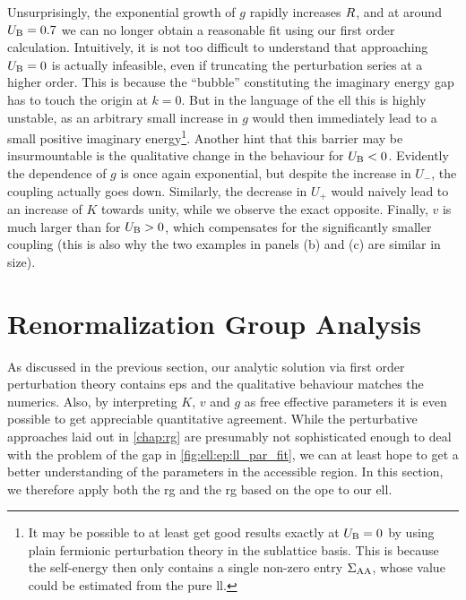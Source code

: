 Unsurprisingly, the exponential growth of $g$ rapidly increases $R$, and at around $U_{\text{B}}=0.7$ we can no longer obtain a reasonable fit using our first order calculation.
Intuitively, it is not too difficult to understand that approaching $U_{\text{B}}=0$ is actually infeasible, even if truncating the perturbation series at a higher order.
This is because the ``bubble'' constituting the imaginary energy gap has to touch the origin at $k=0$.
But in the language of the \gls{ell} this is highly unstable, as an arbitrary small increase in $g$ would then immediately lead to a small positive imaginary energy\footnote{It may be possible to at least get good results exactly at $U_{\text{B}}=0$ by using plain fermionic perturbation theory in the sublattice basis. This is because the self-energy then only contains a single non-zero entry $\Sigma_{\text{A}\text{A}}$, whose value could be estimated from the pure \gls{ll}.}.
Another hint that this barrier may be insurmountable is the qualitative change in the behaviour for $U_{\text{B}}<0$.
Evidently the dependence of $g$ is once again exponential, but despite the increase in $U_-$, the coupling actually goes down.
Similarly, the decrease in $U_+$ would naively lead to an increase of $K$ towards unity, while we observe the exact opposite.
Finally, $v$ is much larger than for $U_{\text{B}}>0$, which compensates for the significantly smaller coupling (this is also why the two examples in panels (b) and (c) are similar in size).
\FloatBarrier
\section{Renormalization Group Analysis}\label{sec:ell:rg}
As discussed in the previous section, our analytic solution via first order perturbation theory contains \glspl{ep} and the qualitative behaviour matches the numerics.
Also, by interpreting $K$, $v$ and $g$ as free effective parameters it is even possible to get appreciable quantitative agreement.
While the perturbative approaches laid out in \autoref{chap:rg} are presumably not sophisticated enough to deal with the problem of the gap in \autoref{fig:ell:ep:ll_par_fit}, we can at least hope to get a better understanding of the parameters in the accessible region.
In this section, we therefore apply both the \tms{} \gls{rg} and the \gls{rg} based on the \gls{ope} to our \gls{ell}.%
